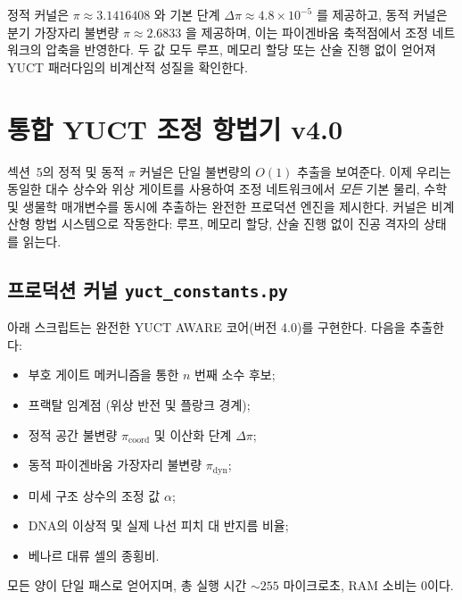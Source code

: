 \documentclass[12pt,a4paper]{article}
\begin{document}
	정적 커널은 $\pi \approx 3.1416408$ 와 기본 단계 $\Delta\pi\approx 4.8\times10^{-5}$ 를 제공하고, 동적 커널은 분기 가장자리 불변량 $\pi \approx 2.6833$ 을 제공하며, 이는 파이겐바움 축적점에서 조정 네트워크의 압축을 반영한다. 두 값 모두 루프, 메모리 할당 또는 산술 진행 없이 얻어져 YUCT 패러다임의 비계산적 성질을 확인한다.
	
	\section{통합 YUCT 조정 항법기 v4.0}
	\label{sec:full-engine}
	
	섹션~5의 정적 및 동적 $\pi$ 커널은 단일 불변량의 $O(1)$ 추출을 보여준다. 이제 우리는 동일한 대수 상수와 위상 게이트를 사용하여 조정 네트워크에서 \emph{모든} 기본 물리, 수학 및 생물학 매개변수를 동시에 추출하는 완전한 프로덕션 엔진을 제시한다. 커널은 비계산형 항법 시스템으로 작동한다: 루프, 메모리 할당, 산술 진행 없이 진공 격자의 상태를 읽는다.
	
	\subsection{프로덕션 커널 \texttt{yuct\_constants.py}}
	
	아래 스크립트는 완전한 YUCT AWARE 코어(버전 4.0)를 구현한다. 다음을 추출한다:
	\begin{itemize}
		\item 부호 게이트 메커니즘을 통한 $n$ 번째 소수 후보;
		\item 프랙탈 임계점 (위상 반전 및 플랑크 경계);
		\item 정적 공간 불변량 $\pi_{\mathrm{coord}}$ 및 이산화 단계 $\Delta\pi$;
		\item 동적 파이겐바움 가장자리 불변량 $\pi_{\mathrm{dyn}}$;
		\item 미세 구조 상수의 조정 값 $\alpha$;
		\item DNA의 이상적 및 실제 나선 피치 대 반지름 비율;
		\item 베나르 대류 셀의 종횡비.
	\end{itemize}
	모든 양이 단일 패스로 얻어지며, 총 실행 시간 $\sim 255$ 마이크로초, RAM 소비는 0이다.
	
\end{document}
